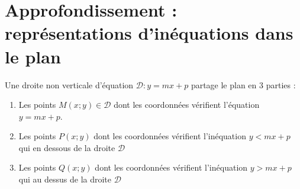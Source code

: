 \documentclass[main.tex]{subfiles}
\begin{document}
%	 

\newpage 
{}  
\pagestyle{scrheadings} %
\onehalfspacing

\section{Approfondissement : représentations d'inéquations dans le plan}

Une droite non verticale d'équation $\mathscr{D}\colon y = mx +p$ partage le plan en 3 parties :
\begin{enumerate}[label=\textbullet, leftmargin=*]
	\item Les points $M(x;y)\in\mathscr{D}$ dont les coordonnées vérifient l'équation $y=mx+p$.
	\item Les points $P(x;y)$ dont les coordonnées vérifient l'inéquation $y<mx+p$ qui en dessous de la droite $\mathscr{D}$
	\item Les points $Q(x;y)$ dont les coordonnées vérifient l'inéquation $y>mx+p$ qui au dessus de la droite $\mathscr{D}$ 
\end{enumerate}
\end{document}
